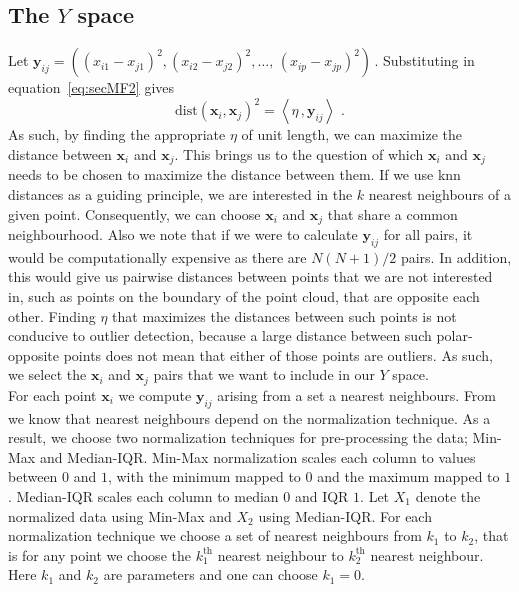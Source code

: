 \documentclass[11pt]{article}
\newcommand{\dist}{\text{dist}}
\begin{document}
\subsection{The $Y$ space}\label{sec:MathFrame1}
Let  $\bm{y}_{ij} = \left( \left( x_{i1} - x_{j1} \right)^2, \left( x_{i2} - x_{j2} \right)^2, \ldots,  \,  \left( x_{ip} - x_{jp} \right)^2  \right)\, . $ Substituting in equation~\eqref{eq:secMF2} gives
\begin{equation}\label{eq:secMF3}
    \dist(\bm{x}_i, \bm{x}_j)^2 = \left\langle \eta\, ,  \bm{y}_{ij} \right\rangle\, \, .
\end{equation}
As such, by finding the appropriate $\eta$ of unit length,  we can maximize the distance between $\bm{x}_i$ and $\bm{x}_j$.  This brings us to the question of which $\bm{x}_i$ and $\bm{x}_j$ needs to be chosen to maximize the distance between them. If we use knn distances as a guiding principle, we are interested in the $k$ nearest neighbours of a given point. Consequently, we can choose $\bm{x}_i$ and $\bm{x}_j$ that share a common neighbourhood. Also we note that if we were to calculate $\bm{y}_{ij}$ for all pairs, it would be computationally expensive as there are $N(N+1)/2$ pairs. In addition, this would give us pairwise distances between points that we are not interested in, such as points on the boundary of the point cloud, that are opposite each other. Finding  $\eta$ that maximizes the distances between such points is not conducive to outlier detection, because a large distance between such polar-opposite points does not mean that either of those points are outliers. As such, we select the  $\bm{x}_i$ and $\bm{x}_j$ pairs that we want to include in our $Y$ space. \\

For each point $\bm{x}_i$ we compute $\bm{y}_{ij}$ arising from a set a nearest neighbours. From \cite{kandanaarachchi2018normalization} we know that nearest neighbours depend on the normalization technique. As a result, we choose two normalization techniques for pre-processing the data; Min-Max and Median-IQR. Min-Max normalization scales each column to values between $0$ and $1$, with the minimum mapped to $0$ and the maximum mapped to $1$.  Median-IQR scales each column to median $0$ and IQR $1$. Let $X_1$ denote the normalized data using  Min-Max and $X_2$ using Median-IQR. For each normalization technique we choose a set of nearest neighbours from $k_1$ to $k_2$, that is for any point we choose the $k_1^{\text{th}}$ nearest neighbour to  $k_2^{\text{th}}$ nearest neighbour. Here $k_1$ and $k_2$ are parameters and one can choose $k_1 =0$. \\
\end{document}
